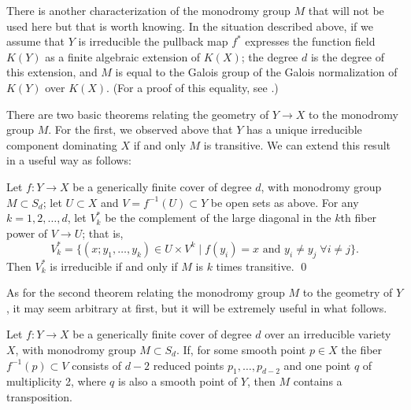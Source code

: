 \begin{fact}
There is another characterization of the monodromy group $M$ that will not be used here but that is worth knowing. In the situation described above, if we assume that $Y$ is irreducible the pullback map $f^*$ expresses the function field $K(Y)$ as a finite algebraic extension of $K(X)$; the degree $d$ is the degree of this extension, and $M$ is equal to the Galois group of the Galois normalization of $K(Y)$ over $K(X)$. (For a proof of this equality, see \cite{Harris1979}.)
\end{fact}

There are two basic theorems relating the geometry of $Y \to X$ to the monodromy group $M$. For the first, we observed above that $Y$ has a unique irreducible component dominating $X$ if and only $M$ is transitive. We can extend this result in a useful way as follows:

\begin{lemma}\label{transitivity lemma}
Let $f : Y \to X$ be a generically finite cover of degree $d$, with  monodromy group $M \subset S_d$; let $U \subset X$ and $V = f^{-1}(U) \subset Y$ be open sets as above. For any $k = 1,2,\dots,d$, let $V_k^*$ be the complement of the large diagonal in the $k$th fiber power of $V \to U$; that is,
$$
V_k^* = \{ (x; y_1,\dots, y_k) \in U \times V^k \mid f(y_i) = x \text{ and } y_i \neq y_j \; \forall i \neq j\}.
$$
Then $V_k^*$ is irreducible if and only if $M$ is $k$ times transitive. \qed
\end{lemma}

As for the second theorem relating the monodromy group $M$ to the geometry of $Y$, it may seem arbitrary at first, but it will be extremely useful in what follows. 

\begin{lemma}\label{transposition lemma}
Let $f : Y \to X$ be a generically finite cover of degree $d$ over an irreducible variety $X$, with  monodromy group $M \subset S_d$.  
If,  for some smooth point $p \in X$ the fiber $f^{-1}(p)\subset V$ consists of $d-2$ reduced points $p_1,\dots, p_{d-2}$ and one point $q$ of multiplicity 2, where $q$ is also a smooth point of $Y$, then $M$ contains a transposition.
\end{lemma}

